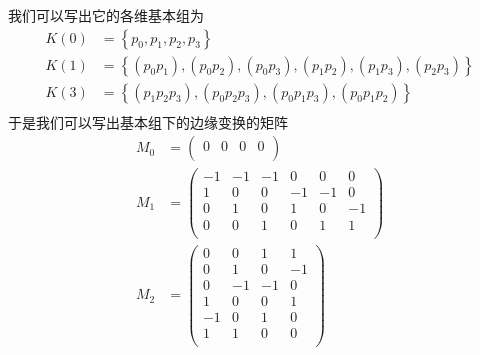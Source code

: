 \begin{figure}[htpb]
    \centering
{}
    \caption{}
    \label{fig:my_label}
\end{figure}
我们可以写出它的各维基本组为
\begin{equation*}
    \begin{aligned}
    K(0)&=\left\{p_{0},p_{1},p_{2},p_{3}\right\}\\
     K(1)&=\left\{(p_{0}p_{1}),(p_{0}p_{2}),(p_{0}p_{3}),(p_{1}p_{2}),(p_{1}p_{3}),(p_{2}p_{3})\right\}\\
     K(3)&=\left\{(p_{1}p_{2}p_{3}),(p_{0}p_{2}p_{3}),(p_{0}p_{1}p_{3}),(p_{0}p_{1}p_{2})\right\}\\
    \end{aligned}
\end{equation*}
于是我们可以写出基本组下的边缘变换的矩阵
\begin{equation*}
    \begin{aligned}
    M_{0}&=\left(\begin{array}{cccc}
     0 & 0  &0 &0 \\
    \end{array}\right)\\
    M_{1}&=\left(\begin{array}{cccccc}
        -1 &-1&-1&0&0&0  \\
        1 &0&0&-1&-1&0\\
        0 &1&0&1&0&-1\\
        0 &0&1&0&1&1\\
    \end{array}\right)\\
    M_{2}&=\left(\begin{array}{cccc}
        0 & 0&1&1 \\
        0 & 1&0&-1 \\
        0 & -1&-1&0 \\
        1 & 0&0&1 \\
        -1 & 0&1&0 \\
        1 & 1&0&0 \\
    \end{array}\right)
    \end{aligned}
\end{equation*}
